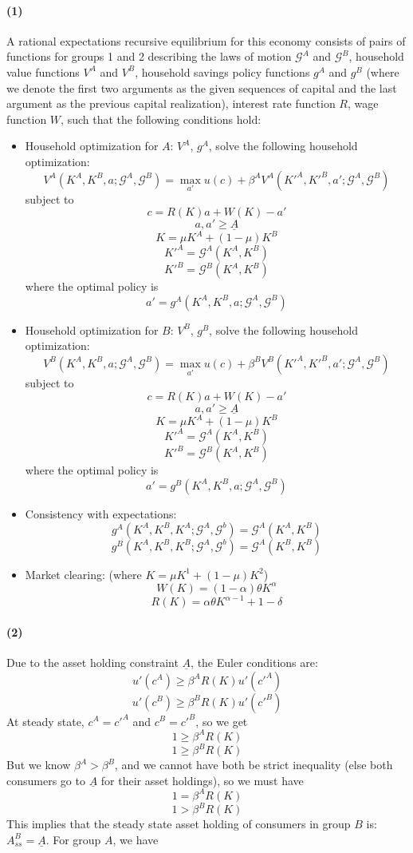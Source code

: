 \documentclass[10pt,letter]{article}
\newcommand{\problempart}[1]{\paragraph{#1}}
\begin{document}
\problempart{(1)}
A rational expectations recursive equilibrium for this economy consists of pairs of functions for groups 1 and 2 describing the laws of motion $\mathcal{G}^A$ and $\mathcal{G}^B$, household value functions $V^A$ and $V^B$, household savings policy functions $g^A$ and $g^B$ (where we denote the first two arguments as the given sequences of capital and the last argument as the previous capital realization), interest rate function $R$, wage function $W$, such that the following conditions hold:
\begin{itemize}
\item Household optimization for $A$: $V^A$, $g^A$, solve the following household optimization:
\[ V^A(K^A, K^B, a; \mathcal{G}^A, \mathcal{G}^B) = \max_{a'} u(c) + \beta^A V^A(K'^A, K'^B, a'; \mathcal{G}^A, \mathcal{G}^B) \]
subject to
\[ c = R(K)a + W(K) - a' \]
\[ a, a' \ge \underline{A} \]
\[ K = \mu K^A + (1-\mu)K^B \]
\[ K'^A = \mathcal{G}^A(K^A, K^B) \]
\[ K'^B = \mathcal{G}^B(K^A, K^B) \]
where the optimal policy is
\[ a' = g^A(K^A, K^B, a; \mathcal{G}^A, \mathcal{G}^B )\]
\item Household optimization for $B$: $V^B$, $g^B$, solve the following household optimization:
\[ V^B(K^A, K^B, a; \mathcal{G}^A, \mathcal{G}^B) = \max_{a'} u(c) + \beta^B V^B(K'^A, K'^B, a'; \mathcal{G}^A, \mathcal{G}^B) \]
subject to
\[ c = R(K)a + W(K) - a' \]
\[ a, a' \ge \underline{A} \]
\[ K = \mu K^A + (1-\mu)K^B \]
\[ K'^A = \mathcal{G}^A(K^A, K^B) \]
\[ K'^B = \mathcal{G}^B(K^A, K^B) \]
where the optimal policy is
\[ a' = g^B(K^A, K^B, a; \mathcal{G}^A, \mathcal{G}^B )\]
\item Consistency with expectations:
\[ g^A(K^A, K^B, K^A; \mathcal{G}^A, \mathcal{G}^b) = \mathcal{G}^A(K^A, K^B)\]
\[ g^B(K^A, K^B, K^B; \mathcal{G}^A, \mathcal{G}^b) = \mathcal{G}^A(K^B, K^B)\]
\item Market clearing: (where $K = \mu K^1 + (1-\mu)K^2$)
\[ W(K) = (1-\alpha)\theta K^\alpha \]
\[ R(K) = \alpha \theta K^{\alpha-1} + 1- \delta \]
\end{itemize}
\problempart{(2)}
Due to the asset holding constraint $\underline{A}$, the Euler conditions are:
\[ u'(c^A) \ge \beta^A R(K) u'(c'^A) \]
\[ u'(c^B) \ge \beta^B R(K) u'(c'^B) \]
At steady state, $c^A = c'^A$ and $c^B = c'^B$, so we get
\[1 \ge \beta^A R(K) \]
\[ 1 \ge \beta^B R(K) \]
But we know $\beta^A > \beta^B$, and we cannot have both be strict inequality (else both consumers go to $\underline{A}$ for their asset holdings), so we must have
\[1 = \beta^A R(K) \]
\[1 > \beta^B R(K) \]
This implies that the steady state asset holding of consumers in group $B$ is: $A^B_{ss} = \underline{A}$. For group $A$, we have
\end{document}
